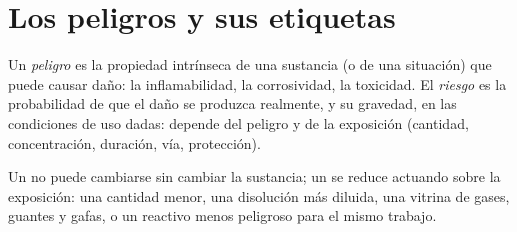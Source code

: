 \section{Los peligros y sus etiquetas}

\begin{definition}\label{def:b1:lab-techniques-1:hazard}
Un \emph{peligro} es la propiedad intrínseca de una
sustancia (o de una situación) que puede causar daño: la inflamabilidad,
la corrosividad, la toxicidad. El \emph{riesgo} es la
probabilidad de que el daño se produzca realmente, y su gravedad, en las
condiciones de uso dadas: depende del peligro y de la exposición
(cantidad, concentración, duración, vía, protección).
\end{definition}

Un  no puede cambiarse sin cambiar la sustancia; un  se
reduce actuando sobre la exposición: una cantidad menor, una disolución
más diluida, una vitrina de gases, guantes y gafas, o un reactivo menos
peligroso para el mismo trabajo.

